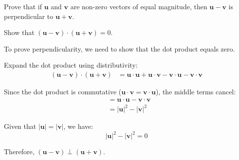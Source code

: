 \vspace{1em}

\begin{problem}
Prove that if $\mathbf{u}$ and $\mathbf{v}$ are non-zero vectors of equal magnitude, then $\mathbf{u} - \mathbf{v}$ is perpendicular to $\mathbf{u} + \mathbf{v}$.
\end{problem}

\begin{hint}
Show that $(\mathbf{u} - \mathbf{v}) \cdot (\mathbf{u} + \mathbf{v}) = 0$.
\end{hint}

\begin{solution}[Sketch]
To prove perpendicularity, we need to show that the dot product equals zero.

Expand the dot product using distributivity:
\begin{align*}
(\mathbf{u} - \mathbf{v}) \cdot (\mathbf{u} + \mathbf{v}) &= \mathbf{u} \cdot \mathbf{u} + \mathbf{u} \cdot \mathbf{v} - \mathbf{v} \cdot \mathbf{u} - \mathbf{v} \cdot \mathbf{v}
\end{align*}

Since the dot product is commutative ($\mathbf{u} \cdot \mathbf{v} = \mathbf{v} \cdot \mathbf{u}$), the middle terms cancel:
\begin{align*}
&= \mathbf{u} \cdot \mathbf{u} - \mathbf{v} \cdot \mathbf{v} \\
&= |\mathbf{u}|^2 - |\mathbf{v}|^2
\end{align*}

Given that $|\mathbf{u}| = |\mathbf{v}|$, we have:
$$|\mathbf{u}|^2 - |\mathbf{v}|^2 = 0$$

Therefore, $(\mathbf{u} - \mathbf{v}) \perp (\mathbf{u} + \mathbf{v})$.
\end{solution}

